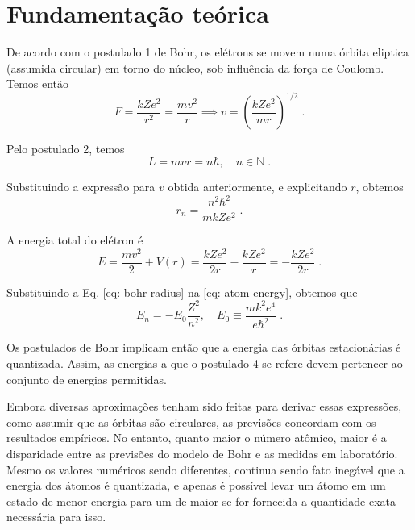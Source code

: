 \section{Fundamentação teórica}

De acordo com o postulado 1 de Bohr, os elétrons se movem numa órbita eliptica (assumida circular)
em torno do núcleo, sob influência da força de Coulomb. 
Temos então
\begin{equation}
F = \frac{kZe^2}{r^2} = \frac{mv^2}{r} 
\implies v = \left( \frac{kZe^2}{mr} \right)^{1/2}  \;.
\end{equation}

\noindent Pelo postulado 2, temos
\begin{equation}
L = mvr = n\hbar, \quad n \in \mathbb{N} \;.
\end{equation}

\noindent Substituindo a expressão para $v$ obtida anteriormente, e explicitando $r$, obtemos
\begin{equation}
r_n = \frac{n^2 \hbar^2}{mkZe^2} \;.
\label{eq: bohr radius}
\end{equation}

\noindent A energia total do elétron é 
\begin{equation}
E = \frac{mv^2}{2} + V(r) = \frac{kZe^2}{2r} - \frac{kZe^2}{r} = -\frac{kZe^2}{2r} \;.
\label{eq: atom energy}
\end{equation}

\noindent Substituindo a Eq. \eqref{eq: bohr radius} na \eqref{eq: atom energy}, obtemos que
\begin{equation}
E_n = -E_0 \frac{Z^2}{n^2}, \quad E_0 \equiv \frac{mk^2e^4}{e\hbar^2} \;.
\end{equation}

Os postulados de Bohr implicam então que a energia das órbitas estacionárias é quantizada. 
Assim, as energias a que o postulado 4 se refere devem pertencer ao conjunto de energias permitidas. \cite{tipler}

Embora diversas aproximações tenham sido feitas para derivar essas expressões, como assumir que as órbitas são
circulares, as previsões concordam com os resultados empíricos. 
No entanto, quanto maior o número atômico, maior é a disparidade entre as previsões do modelo de Bohr e as 
medidas em laboratório. 
Mesmo os valores numéricos sendo diferentes, continua sendo fato inegável que a energia dos átomos é quantizada, 
e apenas é possível levar um átomo em um estado de menor energia para um de maior se for fornecida a quantidade 
exata necessária para isso. 

